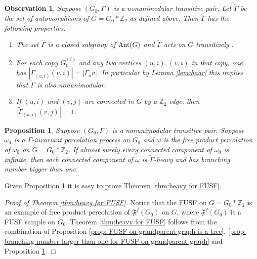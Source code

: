 \documentclass[12pt]{article}
\newtheorem{proposition}[theorem]{Proposition}
\newtheorem{observation}[theorem]{Observation}
\numberwithin{equation}{section}
\newcommand{\1}{\mathbf{1}}
\begin{document}
\begin{observation}\label{obse: action on the free product}
	Suppose $(G_0,\Gamma)$ is a nonunimodular transitive pair. 	Let $\widetilde{\Gamma}$ be the set of automorphisms of $G=G_0*\mathbb{Z}_2$ as defined above.  Then $\widetilde{\Gamma}$ has the following properties.
	\begin{enumerate}
		\item The set $\widetilde{\Gamma}$ is a closed subgroup of $\textnormal{Aut}(G)$ and $\widetilde{\Gamma}$ acts on $G$ transitively .
		\item For each copy $G_0^{(i)}$ and any two vertices $(u,i),(v,i)$ in that copy, one has $|\widetilde{\Gamma}_{(u,i)}(v,i)|=|\Gamma_uv|$. In particular by Lemma \ref{lem:haar}  this implies that $\widetilde{\Gamma}$ is also nonunimodular.
		\item If $(u,i)$ and $(v,j)$ are connected in $G$ by a $\mathbb{Z}_2$-edge, then $|\widetilde{\Gamma}_{(u,i)}(v,j)|=1$.
	\end{enumerate}
\end{observation}


\begin{proposition}\label{prop: free product percolation}
	Suppose $(G_0,\Gamma)$ is a nonunimodular transitive pair.  Suppose $\omega_0$ is a $\Gamma$-invariant percolation process on $G_0$ and   $\omega$ is the {free product percolation} of $\omega_0$ on $G=G_0*\mathbb{Z}_2$. If almost surely every connected component of $\omega_0$ is infinite, then each connected component of $\omega$ is $\widetilde{\Gamma}$-heavy and has branching number bigger than one. 
\end{proposition}

Given Proposition \ref{prop: free product percolation} it is easy  to prove Theorem \ref{thm:heavy for FUSF}.
\begin{proof}[Proof of Theorem \ref{thm:heavy for FUSF}]
	Notice that the FUSF on $G=G_0*\mathbb{Z}_2$ is an example of {free product percolation} of $\mathfrak{F}^f(G_0)$ on $G$, where $\mathfrak{F}^f(G_0)$ is a FUSF sample on $G_0$.
Theorem \ref{thm:heavy for FUSF} follows from the  combination of Proposition \ref{prop: FUSF on grandparent graph is a tree}, \ref{prop: branching number larger than one for FUSF on grandparent graph} and Proposition \ref{prop: free product percolation}. 
\end{proof}
\end{document}
